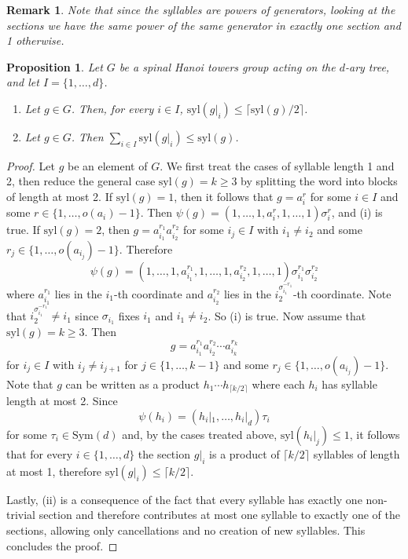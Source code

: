 \documentclass[11pt,leqno]{amsart}
\theoremstyle{plain}
\newtheorem{proposition}[proposition]{Proposition}
\newtheorem{remark}[remark]{Remark}
\newcommand{\Sym}{\mathrm{Sym}}
\newcommand{\Syl}{\mathrm{syl}}
\numberwithin{equation}{section}
\begin{document}
\begin{remark}
Note that since the syllables are powers of generators, looking at the sections we have the same power of the same generator in exactly one section and 1 otherwise. 
\end{remark}

\begin{proposition}\label{Proposition: Contraction} Let $G$ be a spinal Hanoi towers group acting on the $d$-ary tree, and let $I=\{1, \dots, d\}$. 
\begin{enumerate}
    \item Let $g\in G$. Then, for every $i\in I$, $\Syl(g|_i) \leq \lceil \Syl(g)/2 \rceil$.
    \item Let $g\in G$. Then $\sum_{i\in I} \Syl(g|_i) \leq \Syl(g)$.
\end{enumerate}
\end{proposition}
\begin{proof}Let $g$ be an element of $G$. We first treat the cases of syllable length 1 and 2, then reduce the general case $\Syl(g) =k\geq 3$ by splitting the word into blocks of length at most 2. If $\Syl(g)=1$, then it follows that $g=a_i^r$ for some $i\in I$ and some $r\in \{1,\ldots, o(a_i)-1\}$. Then $\psi(g)=(1,\ldots,1,a_i^r,1,\ldots,1)\sigma_i^r$, and (i) is true. If $\Syl(g)=2$, then $g=a_{i_1}^{r_1}a_{i_2}^{r_2}$ for some $i_j\in I$ with $i_1\not=i_2$ and some $r_j\in \{1,\ldots, o(a_{i_j})-1\}$. Therefore 
\[
\psi(g)=(1,\ldots,1, a_{i_1}^{r_1},1,\ldots,1,a_{i_2}^{r_2},1,\ldots,1)\sigma_{i_1}^{r_1} \sigma_{i_2}^{r_2}
\]
where $a_{i_1}^{r_1}$ lies in the $i_1$-th coordinate and $a_{i_2}^{r_2}$ lies in the $i_2^{\sigma_{i_1}^{-r_1}}$-th coordinate. Note that $i_2^{\sigma_{i_1}^{-r_1}}\not=i_1$ since $\sigma_{i_1}$ fixes $i_1$ and $i_1\not=i_2$. So (i) is true. Now assume that $\Syl(g)=k\geq 3$. Then
\[
g=a_{i_1}^{ r_1} a_{i_2}^{ r_2}\cdots a_{i_k}^{ r_k}
\]
for $i_j\in I$ with $i_{j}\not=i_{j+1}$ for $j\in \{1,\ldots,k-1\}$ and some $r_j\in \{1,\ldots,o(a_{i_j})-1\}$. Note that $g$ can be written as a product $h_1\cdots h_{\lceil k/2 \rceil}$ where each $h_i$ has syllable length at most 2. Since
\[
\psi(h_i)=(h_i|_1,\ldots, h_i|_d)\tau_i
\]
for some $\tau_i\in \Sym(d)$ and, by the cases  treated above, $\Syl(h_i|_j)\leq 1$, it follows that for every $i\in \{1,\ldots,d\}$ the section $g|_i$ is a product of $\lceil k/2 \rceil$ syllables of length at most 1, therefore $\Syl(g|_i)\leq \lceil k/2 \rceil$.

Lastly, (ii) is a consequence of the fact that every syllable has exactly one non-trivial section and therefore contributes at most one syllable to exactly one of the sections, allowing only cancellations and no creation of new syllables. This concludes the proof.
\end{proof}
\end{document}
